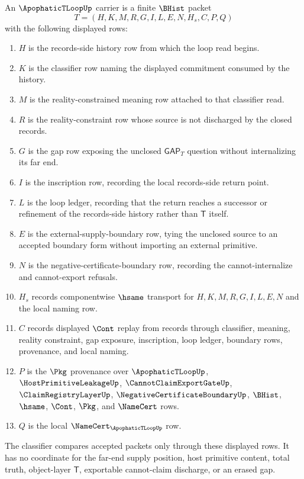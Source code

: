 \begin{definition}
\label{def:apophatic-t-loop-carrier}
An $\ApophaticTLoopUp$ carrier is a finite $\BHist$ packet
$$
T=(H,K,M,R,G,I,L,E,N,H_s,C,P,Q)
$$
with the following displayed rows:
\begin{enumerate}
\item $H$ is the records-side history row from which the loop read begins.
\item $K$ is the classifier row naming the displayed commitment consumed by the history.
\item $M$ is the reality-constrained meaning row attached to that classifier read.
\item $R$ is the reality-constraint row whose source is not discharged by the closed records.
\item $G$ is the gap row exposing the unclosed $\mathsf{GAP}_T$ question without internalizing its far end.
\item $I$ is the inscription row, recording the local records-side return point.
\item $L$ is the loop ledger, recording that the return reaches a successor or refinement of the records-side history rather than $\mathsf{T}$ itself.
\item $E$ is the external-supply-boundary row, tying the unclosed source to an accepted boundary form without importing an external primitive.
\item $N$ is the negative-certificate-boundary row, recording the cannot-internalize and cannot-export refusals.
\item $H_s$ records componentwise $\hsame$ transport for $H,K,M,R,G,I,L,E,N$ and the local naming row.
\item $C$ records displayed $\Cont$ replay from records through classifier, meaning, reality constraint, gap exposure, inscription, loop ledger, boundary rows, provenance, and local naming.
\item $P$ is the $\Pkg$ provenance over $\ApophaticTLoopUp$, $\HostPrimitiveLeakageUp$, $\CannotClaimExportGateUp$, $\ClaimRegistryLayerUp$, $\NegativeCertificateBoundaryUp$, $\BHist$, $\hsame$, $\Cont$, $\Pkg$, and $\NameCert$ rows.
\item $Q$ is the local $\NameCert_{\ApophaticTLoopUp}$ row.
\end{enumerate}
The classifier compares accepted packets only through these displayed rows. It has no coordinate for the far-end supply position, host primitive content, total truth, object-layer $\mathsf{T}$, exportable cannot-claim discharge, or an erased gap.
\end{definition}

